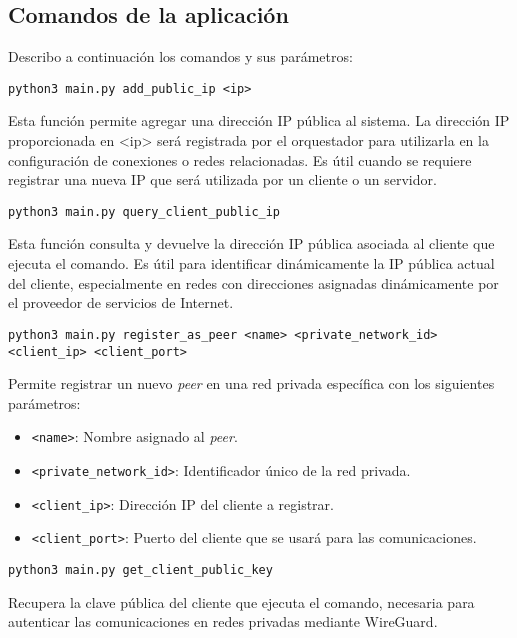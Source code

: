\subsection*{Comandos de la aplicación}
Describo a continuación los comandos y sus parámetros: 
    \begin{Verbatim}[breaklines=true]
    python3 main.py add_public_ip <ip>
    \end{Verbatim}

    Esta función permite agregar una dirección IP pública al sistema. La dirección IP proporcionada en <ip> será registrada por el orquestador para utilizarla en la configuración de conexiones o redes relacionadas. Es útil cuando se requiere registrar una nueva IP que será utilizada por un cliente o un servidor.
    
    \begin{Verbatim}[breaklines=true]
    python3 main.py query_client_public_ip
    \end{Verbatim}

    Esta función consulta y devuelve la dirección IP pública asociada al cliente que ejecuta el comando. Es útil para identificar dinámicamente la IP pública actual del cliente, especialmente en redes con direcciones asignadas dinámicamente por el proveedor de servicios de Internet.
    
    \begin{Verbatim}[breaklines=true]
        python3 main.py register_as_peer <name> <private_network_id> <client_ip> <client_port>
    \end{Verbatim}
        
    Permite registrar un nuevo \textit{peer} en una red privada específica con los siguientes parámetros:  
    \begin{itemize}
        \item \texttt{<name>}: Nombre asignado al \textit{peer}.
        \item \texttt{<private\_network\_id>}: Identificador único de la red privada.
        \item \texttt{<client\_ip>}: Dirección IP del cliente a registrar.
        \item \texttt{<client\_port>}: Puerto del cliente que se usará para las comunicaciones.
    \end{itemize}
        

    \begin{Verbatim}[breaklines=true]
    python3 main.py get_client_public_key
    \end{Verbatim} 
    Recupera la clave pública del cliente que ejecuta el comando, necesaria para autenticar las comunicaciones en redes privadas mediante WireGuard.
    
